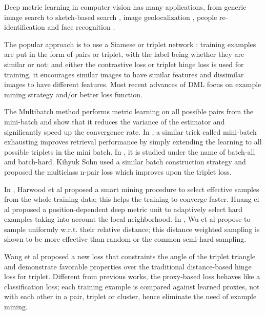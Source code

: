 \documentclass[10pt,twocolumn,letterpaper]{article}
\begin{document}
Deep metric learning in computer vision has many applications, from generic image search \cite{wang2014learning} to sketch-based search \cite{sangkloy2016sketchy}, image geolocalization \cite{vo2016localizing, vo2017revisiting}, people re-identification \cite{ding2015deep,hermans2017defense} and face recognition \cite{schroff2015facenet, Parkhi15}.

The popular approach is to use a Siamese \cite{bromley1994signature,chopra2005learning} or triplet network \cite{wu2013online,wang2014learning,vo2016localizing}: training examples are put in the form of pairs or triplet, with the label being whether they are similar or not; and either the contrastive loss or triplet hinge loss is used for training, it encourages similar images to have similar features and dissimilar images to have different features.
Most recent advances of DML focus on example mining strategy and/or better loss function.

The Multibatch method \cite{tadmor2016learning} performs metric learning on all possible pairs from the mini-batch and show that it reduces the variance of the estimator and significantly speed up the convergence rate. In \cite{vo2016localizing},
a similar trick called mini-batch exhausting improves retrieval performance by simply extending the learning to all possible triplets in the mini batch. In \cite{hermans2017defense}, it is studied under the name of batch-all and batch-hard. Kihyuk Sohn \cite{sohn2016improved} used a similar batch construction strategy and proposed the multiclass n-pair loss which improves upon the triplet loss.


In \cite{kumar2017smart}, Harwood et al proposed a smart mining procedure to select effective samples from the whole training data; this helps the training to converge faster. 
Huang el al \cite{huang2016local} proposed a position-dependent deep metric unit to adaptively select hard examples taking into account the local neighborhood.
In \cite{wu2017sampling}, Wu et al propose to sample uniformly w.r.t. 
their relative distance; this distance weighted sampling is shown to be more effective than random or the common semi-hard sampling.

Wang et al \cite{wang2017deep} proposed a new loss that constraints the angle of the triplet triangle and demonstrate favorable properties over the traditional distance-based hinge loss for triplet. Different from previous works, the proxy-based loss \cite{movshovitz2017no} behaves like a classification loss; each training example is compared against learned proxies, not with each other in a pair, triplet or cluster, hence eliminate the need of example mining.
\end{document}
